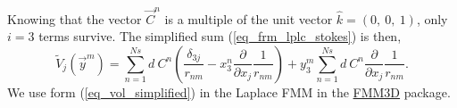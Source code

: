 Knowing that the vector $\vec{C}^n$ is a multiple of the unit vector $\hat{k} = (0, \ 0, \ 1)$, only $i = 3$ terms survive. The simplified sum (\ref{eq_frm_lplc_stokes}) is then,
\begin{equation}
	\tilde{V}_j (\vec{y}^m) 
	=
		\sum_{n=1}^{Ns} 
		d \ {C}^n
		\left(
			\frac{ \delta_{3j} }{r_{nm}}
			- 
			 x_3^n  
			\frac{\partial}{\partial x_j}
				\frac{1}{r_{nm}}
				\right)
			+
			   y_3^m  
			\sum_{n=1}^{Ns} 
			d \ {C}^n
			\frac{\partial}{\partial x_j}
				\frac{1}{r_{nm}}.
\label{eq_vol_simplified}
\end{equation}
%
We use form (\ref{eq_vol_simplified}) in the Laplace FMM in the \href{https://github.com/flatironinstitute/FMM3D}{FMM3D} package.
%
%
